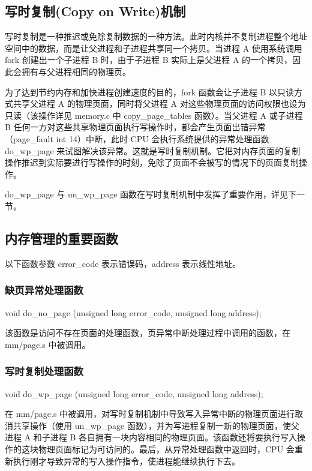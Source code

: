 \subsection{写时复制(Copy on Write)机制}

写时复制是一种推迟或免除复制数据的一种方法。此时内核并不复制进程整个地址空间中的数据，而是让父进程和子进程共享同一个拷贝。当进程 A 使用系统调用 fork 创建出一个子进程 B 时，由于子进程 B 实际上是父进程 A 的一个拷贝，因此会拥有与父进程相同的物理页。

为了达到节约内存和加快进程创建速度的目的，fork 函数会让子进程 B 以只读方式共享父进程 A 的物理页面，同时将父进程 A 对这些物理页面的访问权限也设为只读（该操作详见 memory.c 中 copy\_page\_tables 函数）。当父进程 A 或子进程 B 任何一方对这些共享物理页面执行写操作时，都会产生页面出错异常（page\_fault int 14）中断，此时 CPU 会执行系统提供的异常处理函数 do\_wp\_page 来试图解决该异常。这就是写时复制机制。它把对内存页面的复制操作推迟到实际要进行写操作的时刻，免除了页面不会被写的情况下的页面复制操作。

do\_wp\_page 与 un\_wp\_page 函数在写时复制机制中发挥了重要作用，详见下一节。

\subsection{内存管理的重要函数}

以下函数参数 error\_code 表示错误码，address 表示线性地址。

\subsubsection{缺页异常处理函数}

void do\_no\_page (unsigned long error\_code, unsigned long address);

该函数是访问不存在页面的处理函数，页异常中断处理过程中调用的函数，在 mm/page.s 中被调用。

\subsubsection{写时复制处理函数}

void do\_wp\_page (unsigned long error\_code, unsigned long address);

在 mm/page.s 中被调用，对写时复制机制中导致写入异常中断的物理页面进行取消共享操作（使用 un\_wp\_page 函数），并为写进程复制一新的物理页面，使父进程 A 和子进程 B 各自拥有一块内容相同的物理页面。该函数还将要执行写入操作的这块物理页面标记为可访问的。最后，从异常处理函数中返回时，CPU 会重新执行刚才导致异常的写入操作指令，使进程能继续执行下去。

